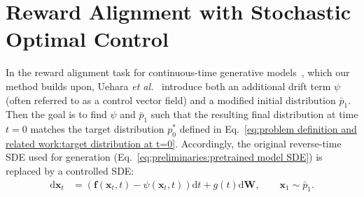 \section{Reward Alignment with Stochastic Optimal Control}
\label{sec:appx:SOC}
In the reward alignment task for continuous-time generative models~\cite{uehara2024finetuningcontinuoustimediffusionmodels, domingo-enrich2025adjoint}, which our method builds upon, Uehara \textit{et al.}~\cite{uehara2024finetuningcontinuoustimediffusionmodels} introduce both an additional drift term $\psi$ (often referred to as a control vector field) and a modified initial distribution $\bar{p}_1$. 
Then the goal is to find $\psi$ and $\bar{p}_1$ such that the resulting final distribution at time $t=0$ matches the target distribution $p_0^*$ defined in Eq.~\ref{eq:problem definition and related work:target distribution at t=0}. Accordingly, the original reverse-time SDE used for generation (Eq.~\ref{eq:preliminaries:pretrained model SDE}) is replaced by a controlled SDE:
\begin{align}
    \label{eq:SOC:target SDE}
    \mathrm{d}\mathbf{x}_t &= \left(\mathbf{f}(\mathbf{x}_t, t)-\psi(\mathbf{x}_t, t) \right)\mathrm{d}t + g(t)\mathrm{d}\mathbf{W}, \qquad \mathbf{x}_1\sim \bar{p}_1.
\end{align}

